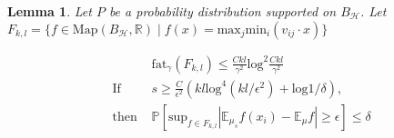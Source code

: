 \documentclass{ujarticle}
\newtheorem{lem}[thm]{Lemma}
\begin{document}
\begin{lem}
\label{projvar}
  Let $P$ be a probability distribution supported on $B_{\mathcal{H}}$.
  Let $F_{k,l} = \{ f \in \mathrm{Map}(B_{\mathcal{H}},\mathbb{R}) \mid f(x)=\mathrm{max}_j \mathrm{min}_i(v_{ij} \cdot x) \}$

\begin{eqnarray*}
  & & \mathrm{fat}_{\gamma}(F_{k,l}) \le \frac{Ckl}{\gamma^2}\mathrm{log}^2 \frac{Ckl}{\gamma^2} \\
  &\mbox{If } & s \ge \frac{C}{\epsilon^2 }(kl \mathrm{log}^4(kl/\epsilon^2)+ \mathrm{log}{1/\delta}), \\
  &\mbox{then } & \mathbb{P}[\mathrm{sup}_{f \in F_{k,l}}| \mathbb{E}_{\mu_s}f(x_i) - \mathbb{E}_{\mu}f| \ge \epsilon ] \le \delta
\end{eqnarray*}
\end{lem}
\end{document}
